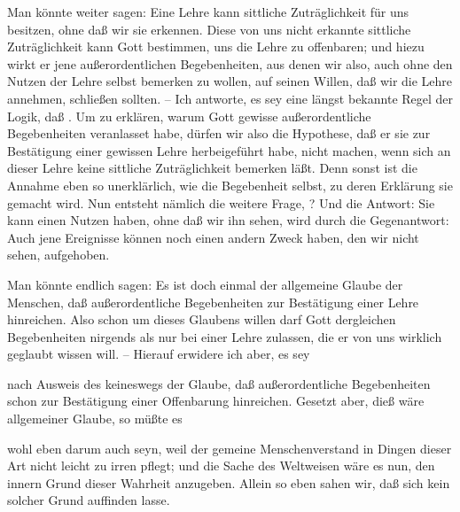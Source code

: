 \begin{aufza}
\item Man könnte weiter sagen: Eine Lehre kann sittliche Zuträglichkeit für uns besitzen, ohne daß wir sie erkennen. Diese von uns nicht erkannte sittliche Zuträglichkeit kann Gott bestimmen, uns die Lehre zu offenbaren; und hiezu wirkt er jene außerordentlichen Begebenheiten, aus denen wir also, auch ohne den Nutzen der Lehre selbst bemerken zu wollen, auf seinen Willen, daß wir die Lehre annehmen, schließen sollten. -- Ich antworte, es sey eine längst bekannte Regel der Logik, daß . Um zu erklären, warum Gott gewisse außerordentliche Begebenheiten veranlasset habe, dürfen wir also die Hypothese, daß er sie zur Bestätigung einer gewissen Lehre herbeigeführt habe, nicht machen, wenn sich an dieser Lehre keine sittliche Zuträglichkeit bemerken läßt. Denn sonst ist die Annahme eben so unerklärlich, wie die Begebenheit selbst, zu deren Erklärung sie gemacht wird. Nun entsteht nämlich die weitere Frage, ? Und die Antwort: Sie kann einen Nutzen haben, ohne daß wir ihn sehen, wird durch die Gegenantwort: Auch jene Ereignisse können noch einen andern Zweck haben, den wir nicht sehen, aufgehoben.
\item Man könnte endlich sagen: Es ist doch einmal der allgemeine Glaube der Menschen, daß außerordentliche Begebenheiten zur Bestätigung einer Lehre hinreichen. Also schon um dieses Glaubens willen darf Gott dergleichen Begebenheiten nirgends als nur bei einer Lehre zulassen,
die er von uns wirklich geglaubt wissen will. -- Hierauf erwidere ich aber, es sey
\begin{aufzb}
\item nach Ausweis des  keineswegs der  Glaube, daß außerordentliche Begebenheiten  schon zur Bestätigung einer Offenbarung hinreichen. Gesetzt aber, dieß wäre allgemeiner Glaube, so müßte es
\item wohl eben darum auch  seyn, weil der gemeine Menschenverstand in Dingen dieser Art nicht leicht zu irren pflegt; und die Sache des Weltweisen wäre es nun, den innern Grund dieser Wahrheit anzugeben. Allein so eben sahen wir, daß sich kein solcher Grund auffinden lasse.
\end{aufzb}
\end{aufza}

